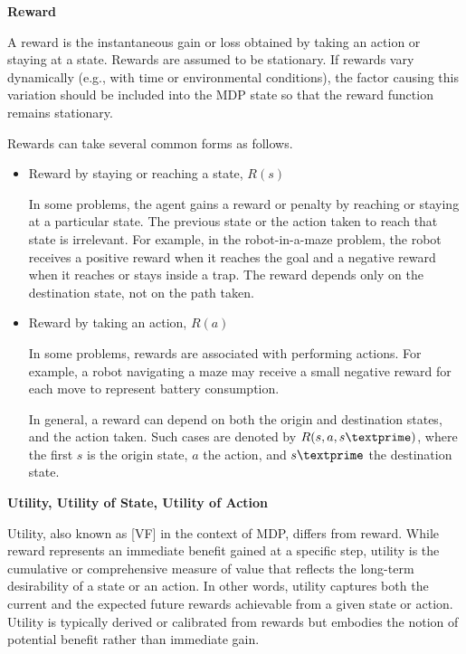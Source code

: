 \vspace{0.1in}
\noindent \textbf{Reward}
\vspace{0.1in}

A reward is the instantaneous gain or loss obtained by taking an action or staying at a state. Rewards are assumed to be stationary. If rewards vary dynamically (e.g., with time or environmental conditions), the factor causing this variation should be included into the MDP state so that the reward function remains stationary.  

Rewards can take several common forms as follows.
\begin{itemize}
	\item Reward by staying or reaching a state, $R(s)$
	
	In some problems, the agent gains a reward or penalty by reaching or staying at a particular state. The previous state or the action taken to reach that state is irrelevant.  
	For example, in the robot-in-a-maze problem, the robot receives a positive reward when it reaches the goal and a negative reward when it reaches or stays inside a trap. The reward depends only on the destination state, not on the path taken.
	
	\item Reward by taking an action, $R(a)$
	
	In some problems, rewards are associated with performing actions. For example, a robot navigating a maze may receive a small negative reward for each move to represent battery consumption.  
	
	In general, a reward can depend on both the origin and destination states, and the action taken. Such cases are denoted by $R(s, a, s\textprime)$, where the first $s$ is the origin state, $a$ the action, and $s\textprime$ the destination state.
\end{itemize}

\vspace{0.1in}
\noindent \textbf{Utility, Utility of State, Utility of Action}
\vspace{0.1in}

Utility, also known as [VF] in the context of MDP, differs from reward. While reward represents an immediate benefit gained at a specific step, utility is the cumulative or comprehensive measure of value that reflects the long-term desirability of a state or an action. In other words, utility captures both the current and the expected future rewards achievable from a given state or action. Utility is typically derived or calibrated from rewards but embodies the notion of potential benefit rather than immediate gain.

